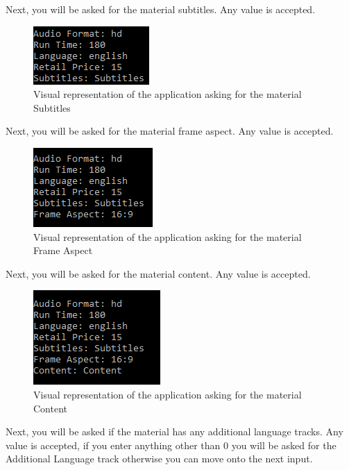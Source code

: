 \documentclass[
  english,
  a4paper,
,tablecaptionabove
]{scrartcl}
\begin{document}
Next, you will be asked for the material subtitles. Any value is
accepted.

\begin{figure}
\centering
\includegraphics{images/user-guide/maintenance-mode/add-material-subtitles.png}
\caption{Visual representation of the application asking for the
material Subtitles}
\end{figure}

Next, you will be asked for the material frame aspect. Any value is
accepted.

\begin{figure}
\centering
\includegraphics{images/user-guide/maintenance-mode/add-material-frame-aspect.png}
\caption{Visual representation of the application asking for the
material Frame Aspect}
\end{figure}

Next, you will be asked for the material content. Any value is accepted.

\begin{figure}
\centering
\includegraphics{images/user-guide/maintenance-mode/add-material-content.png}
\caption{Visual representation of the application asking for the
material Content}
\end{figure}

Next, you will be asked if the material has any additional language
tracks. Any value is accepted, if you enter anything other than 0 you
will be asked for the Additional Language track otherwise you can move
onto the next input.
\end{document}
